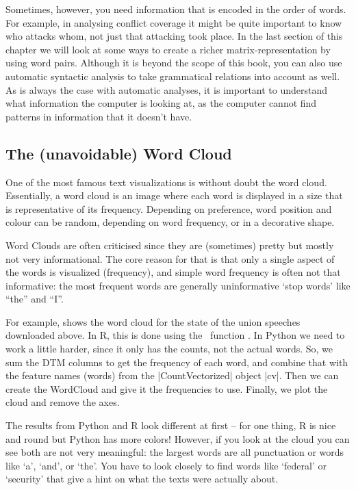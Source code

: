 Sometimes, however, you need information that is encoded in the order of words.
For example, in analysing conflict coverage it might be quite important to know who attacks whom, not just that attacking took place.
In the last section of this chapter we will look at some ways to create a richer matrix-representation by using word pairs.
Although it is beyond the scope of this book,
you can also use automatic syntactic analysis to take grammatical relations into account as well.
As is always the case with automatic analyses, it is important to understand what information the computer is looking at,
as the computer cannot find patterns in information that it doesn't have.

\subsection{The (unavoidable) Word Cloud}

One of the most famous text visualizations is without doubt the word cloud.
Essentially, a word cloud is an image where each word is displayed in a size that is representative of its frequency.
Depending on preference, word position and colour can be random, depending on word frequency, or in a decorative shape.

Word Clouds are often criticised since they are (sometimes) pretty but mostly not very informational.
The core reason for that is that only a single aspect of the words is visualized (frequency),
and simple word frequency is often not that informative: the most frequent words are generally uninformative `stop words' like ``the'' and ``I''.

For example,  shows the word cloud for the state of the union speeches downloaded above.
In R, this is done using the \quanteda\ function .
In Python we need to work a little harder, since it only has the counts, not the actual words.
So, we sum the DTM columns to get the frequency of each word, and combine that with the feature names (words)
from the |CountVectorized| object |cv|. Then we can create the WordCloud and give it the frequencies to use.
Finally, we plot the cloud and remove the axes.


The results from Python and R look different at first -- for one thing, R is nice and round but Python has more colors!
However, if you look at the cloud you can see both are not very meaningful: the largest words are all punctuation or words like
`a', `and', or `the'.
You have to look closely to find words like `federal' or `security' that give a hint on what the texts were actually about.


